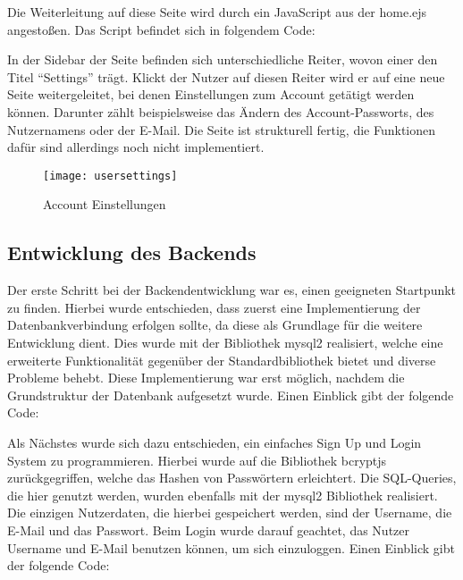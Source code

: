 Die Weiterleitung auf diese Seite wird durch ein JavaScript aus der home.ejs angestoßen.
Das Script befindet sich in folgendem Code:

\vspace{1em}

\vspace{1em}

In der Sidebar der Seite befinden sich unterschiedliche Reiter, wovon einer den Titel ``Settings'' trägt.
Klickt der Nutzer auf diesen Reiter wird er auf eine neue Seite weitergeleitet, bei denen Einstellungen zum Account getätigt werden können.
Darunter zählt beispielsweise das Ändern des Account-Passworts, des Nutzernamens oder der E-Mail.
Die Seite ist strukturell fertig, die Funktionen dafür sind allerdings noch nicht implementiert.

\begin{figure}[h]
    \centering
    \texttt{[image: usersettings]}
    \caption{Account Einstellungen}
    \label{fig:usersettings}
\end{figure}

\newpage

\subsection{Entwicklung des Backends}\label{subsec:EntwicklungDesBackends}
Der erste Schritt bei der Backendentwicklung war es, einen geeigneten Startpunkt zu finden.
Hierbei wurde entschieden, dass zuerst eine Implementierung der Datenbankverbindung erfolgen sollte, da diese als Grundlage für die weitere Entwicklung dient.
Dies wurde mit der Bibliothek mysql2 realisiert, welche eine erweiterte Funktionalität gegenüber der Standardbibliothek bietet und diverse Probleme behebt.
Diese Implementierung war erst möglich, nachdem die Grundstruktur der Datenbank aufgesetzt wurde.
Einen Einblick gibt der folgende Code:

\vspace{1em}

\vspace{1em}
\newpage

Als Nächstes wurde sich dazu entschieden, ein einfaches Sign Up und Login System zu programmieren.
Hierbei wurde auf die Bibliothek bcryptjs zurückgegriffen, welche das Hashen von Passwörtern erleichtert.
Die SQL-Queries, die hier genutzt werden, wurden ebenfalls mit der mysql2 Bibliothek realisiert.
Die einzigen Nutzerdaten, die hierbei gespeichert werden, sind der Username, die E-Mail und das Passwort.
Beim Login wurde darauf geachtet, das Nutzer Username und E-Mail benutzen können, um sich einzuloggen.
Einen Einblick gibt der folgende Code:

